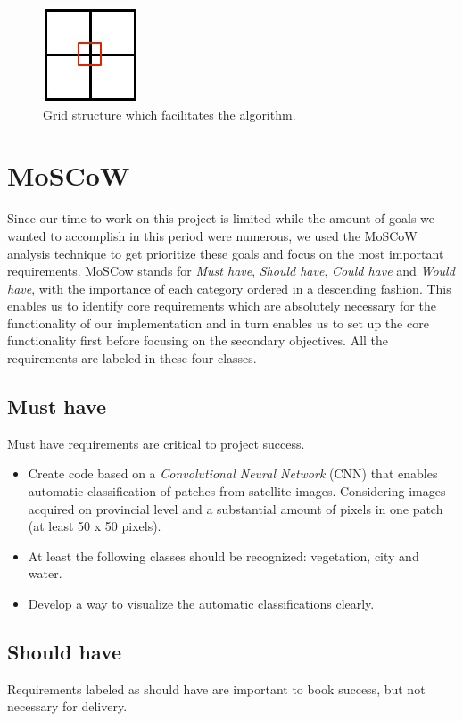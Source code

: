 \documentclass[a4paper,onecolumn]{report}
\begin{document}
\begin{figure}[h!]
    \centering
    \includegraphics[scale=0.6]{./images/grid.jpg}
    \caption{Grid structure which facilitates the algorithm.}
	\label{fig:grid}
\end{figure}

\section{MoSCoW}
Since our time to work on this project is limited while the amount of goals we wanted to accomplish in this period were numerous, we used the MoSCoW analysis technique to get prioritize these goals and focus on the most important requirements. MoSCow stands for \textit{Must have}, \textit{Should have}, \textit{Could have} and \textit{Would have}, with the importance of each category ordered in a descending fashion. This enables us to identify core requirements which are absolutely necessary for the functionality of our implementation and in turn enables us to set up the core functionality first before focusing on the secondary objectives. All the requirements are labeled in these four classes.\\

\subsection{Must have}
Must have requirements are critical to project success. 
\begin{itemize}
\item Create code based on a \textit{Convolutional Neural Network} (CNN) that enables automatic classification of patches from satellite images. Considering images acquired on provincial level and a substantial amount of pixels in one patch (at least 50 x 50 pixels). 
\item At least the following classes should be recognized: vegetation, city and water. 
\item Develop a way to visualize the automatic classifications clearly.
\end{itemize}

\subsection{Should have}
Requirements labeled as should have are important to book success, but not necessary for delivery. 
\end{document}
